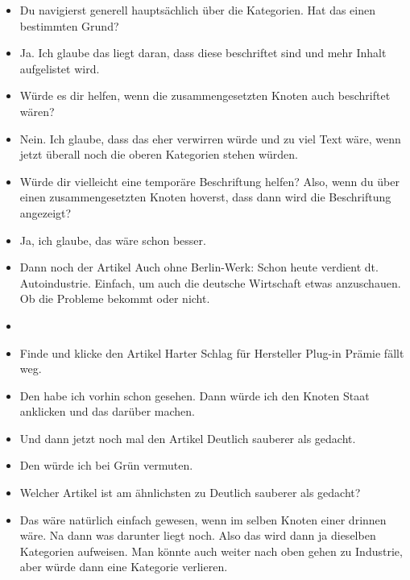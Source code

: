 {\begin{itemize}[]
            \item {} Du navigierst generell hauptsächlich über die Kategorien.
                  Hat das einen bestimmten Grund?
            \item {} Ja.
                  Ich glaube das liegt daran, dass diese beschriftet sind und mehr Inhalt aufgelistet wird.
            \item {} Würde es dir helfen, wenn die zusammengesetzten Knoten auch beschriftet wären?
            \item {} Nein.
                  Ich glaube, dass das eher verwirren würde und zu viel Text wäre, wenn jetzt überall noch die oberen Kategorien stehen würden.
            \item {} Würde dir vielleicht eine temporäre Beschriftung helfen?
                  Also, wenn du über einen zusammengesetzten Knoten hoverst, dass dann wird die Beschriftung angezeigt?
            \item {} Ja, ich glaube, das wäre schon besser.
            \item {} Dann noch der Artikel \flqq Auch ohne Berlin-Werk: Schon heute verdient dt. Autoindustrie\frqq{}.
                  Einfach, um auch die deutsche Wirtschaft etwas anzuschauen.
                  Ob die Probleme bekommt oder nicht.
            \item {}
            \item {} Finde und klicke den Artikel \flqq Harter Schlag für Hersteller Plug-in Prämie fällt weg\frqq{}.
            \item {} Den habe ich vorhin schon gesehen.
                  Dann würde ich den Knoten Staat anklicken und das darüber machen.
            \item {} Und dann jetzt noch mal den Artikel \flqq Deutlich sauberer als gedacht\frqq{}.
            \item {} Den würde ich bei Grün vermuten.
            \item {} Welcher Artikel ist am ähnlichsten zu \flqq Deutlich sauberer als gedacht\frqq{}?
            \item {} Das wäre natürlich einfach gewesen, wenn im selben Knoten einer drinnen wäre.
                  Na dann was darunter liegt noch. Also das wird dann ja dieselben Kategorien aufweisen.
                  Man könnte auch weiter nach oben gehen zu Industrie, aber würde dann eine Kategorie verlieren.

\end{itemize}}
